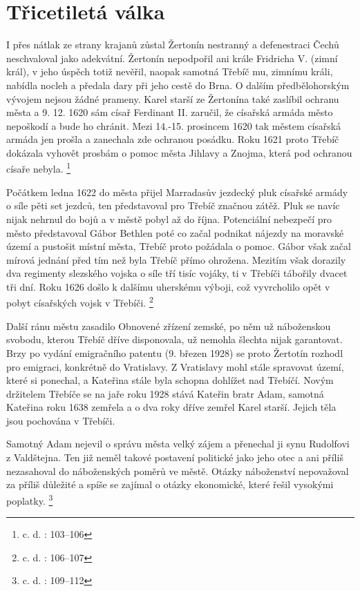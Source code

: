\documentclass[a4paper,oneside,12p]{report}
\begin{document}
\section{Třicetiletá válka}

I přes nátlak ze strany krajanů zůstal Žertonín nestranný a defenestraci Čechů neschvaloval jako adekvátní.
Žertonín nepodpořil ani krále Fridricha V. (zimní král), v jeho úspěch totiž nevěřil, naopak samotná Třebíč mu, zimnímu králi, nabídla nocleh a předala dary při jeho cestě do Brna.
O dalším předbělohorským vývojem nejsou žádné prameny.
Karel starší ze Žertonína také zaslíbil ochranu města a 9. 12. 1620 sám císař Ferdinant II. zaručil, že císařská armáda město nepoškodí a bude ho chránit.
Mezi 14.-15. prosincem 1620 tak městem císařská armáda jen prošla a zanechala zde ochranou posádku.
Roku 1621 proto Třebíč dokázala vyhovět prosbám o pomoc města Jihlavy a Znojma, která pod ochranou císaře nebyla. \footnote{c. d. : 103--106}

Počátkem ledna 1622 do města přijel Marradasův jezdecký pluk císařské armády o síle pěti set jezdců, ten představoval pro Třebíč značnou zátěž.
Pluk se navíc nijak nehrnul do bojů a v městě pobyl až do října.
Potenciální nebezpečí pro město představoval Gábor Bethlen poté co začal podnikat nájezdy na moravské území a pustošit místní města, Třebíč proto požádala o pomoc.
Gábor však začal mírová jednání před tím než byla Třebíč přímo ohrožena.
Mezitím však dorazily dva regimenty slezského vojska o síle tří tisíc vojáky, ti v Třebíči tábořily dvacet tři dní.
Roku 1626 došlo k dalšímu uherskému výboji, což vyvrcholilo opět v pobyt císařských vojsk v Třebíči. \footnote{c. d. : 106--107}

Další ránu městu zasadilo Obnovené zřízení zemské, po něm už náboženskou svobodu, kterou Třebíč dříve disponovala, už nemohla šlechta nijak garantovat.
Brzy po vydání emigračního patentu (9. březen 1928) se proto Žertotín rozhodl pro emigraci, konkrétně do Vratislavy.
Z Vratislavy mohl stále spravovat území, které si ponechal, a Kateřina stále byla schopna dohlížet nad Třebíčí.
Novým držitelem Třebíče se na jaře roku 1928 stává Kateřin bratr Adam, samotná Kateřina roku 1638 zemřela a o dva roky dříve zemřel Karel starší. %
Jejich těla jsou pochována v Třebíči. %

Samotný Adam nejevil o správu města velký zájem a přenechal ji synu Rudolfovi z Valdštejna.
Ten již neměl takové postavení politické jako jeho otec a ani příliš nezasahoval do náboženských poměrů ve městě.
Otázky náboženství nepovažoval za příliš důležité a spíše se zajímal o otázky ekonomické, které řešil vysokými poplatky. \footnote{c. d. : 109--112}
\end{document}
